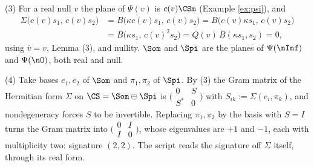 (3) For a real null $v$ the plane of $\Psi(v)$ is $c(v)\CSm$ (Example \ref{ex:psi}), and
\begin{align*}
\Sigma\bigl(c(v)s_1,\, c(v)s_2\bigr) &= B\bigl(\kappa c(v)s_1,\, c(v)s_2\bigr) = B\bigl(c(v)\kappa s_1,\, c(v)s_2\bigr)\\
&= B\bigl(\kappa s_1,\, c(v)^2 s_2\bigr) = Q(v)\,B(\kappa s_1, s_2) = 0 ,
\end{align*}
using $\bar v = v$, Lemma (3), and nullity. $\Som$ and $\Spi$ are the planes of $\Psi(\nInf)$ and $\Psi(\nO)$, both real and null.

(4) Take bases $e_1, e_2$ of $\Som$ and $\pi_1, \pi_2$ of $\Spi$. By (3) the Gram matrix of the Hermitian form $\Sigma$ on $\CS = \Som\oplus\Spi$ is $\bigl(\begin{smallmatrix} 0 & S \\ S^* & 0\end{smallmatrix}\bigr)$ with $S_{ik} := \Sigma(e_i, \pi_k)$, and nondegeneracy forces $S$ to be invertible. Replacing $\pi_1, \pi_2$ by the basis with $S = I$ turns the Gram matrix into $\bigl(\begin{smallmatrix} 0 & I \\ I & 0\end{smallmatrix}\bigr)$, whose eigenvalues are $+1$ and $-1$, each with multiplicity two: signature $(2,2)$. The script reads the signature off $\Sigma$ itself, through its real form.

